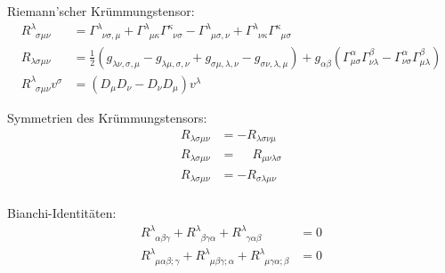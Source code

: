 \documentclass[11pt]{article}
\numberwithin{equation}{section}
\begin{document}
				\noindent
				Riemann'scher Krümmungstensor:
				\begin{equation}
					\begin{aligned}
						R^{\lambda}_{\phantom{\lambda}\sigma\mu\nu} &= \Gamma^{\lambda}_{\phantom{\lambda}\nu\sigma,\mu}
						+ \Gamma^{\lambda}_{\phantom{\lambda}\mu\kappa}\Gamma^{\kappa}_{\phantom{\kappa}\nu\sigma}
						-
						\Gamma^{\lambda}_{\phantom{\lambda}\mu\sigma,\nu}
						+ \Gamma^{\lambda}_{\phantom{\lambda}\nu\kappa}\Gamma^{\kappa}_{\phantom{\kappa}\mu\sigma} \\
						R_{\lambda\sigma\mu\nu} &= \frac{1}{2}\left(
						g_{\lambda\nu,\sigma,\mu} - g_{\lambda\mu,\sigma,\nu} + g_{\sigma\mu,\lambda,\nu} -	 g_{\sigma\nu,\lambda,\mu}
						\right)
						+ g_{\alpha\beta} \left(
						\Gamma^{\alpha}_{\mu\sigma} \Gamma^{\beta}_{\nu\lambda} - \Gamma^{\alpha}_{\nu\sigma} \Gamma^{\beta}_{\mu\lambda}
						\right)
						\\
						R^{\lambda}_{\phantom{\lambda}\sigma\mu\nu}v^\sigma &= \left(D_\mu D_\nu - D_\nu D_\mu \right) v^\lambda
					\end{aligned}
				\end{equation}

				\noindent
				Symmetrien des Krümmungstensors:
				\begin{equation}
					\begin{aligned}
						R_{\lambda\sigma\mu\nu} &= - R_{\lambda\sigma\nu\mu} \\
						R_{\lambda\sigma\mu\nu} &= \phantom{-} R_{\mu\nu\lambda\sigma} \\
						R_{\lambda\sigma\mu\nu} &= - R_{\sigma\lambda\mu\nu} \\
					\end{aligned}
				\end{equation}

				\noindent
				Bianchi-Identitäten:
				\begin{equation}
					\begin{aligned}
						R^{\lambda}_{\phantom{\lambda}\alpha\beta\gamma} + R^{\lambda}_{\phantom{\lambda}\beta\gamma\alpha} + R^{\lambda}_{\phantom{\lambda}\gamma\alpha\beta} &= 0 \\
						R^{\lambda}_{\phantom{\lambda}\mu\alpha\beta;\gamma} + R^{\lambda}_{\phantom{\lambda}\mu\beta\gamma;\alpha} + R^{\lambda}_{\phantom{\lambda}\mu\gamma\alpha;\beta} &= 0 \\
					\end{aligned}
				\end{equation}
\end{document}
